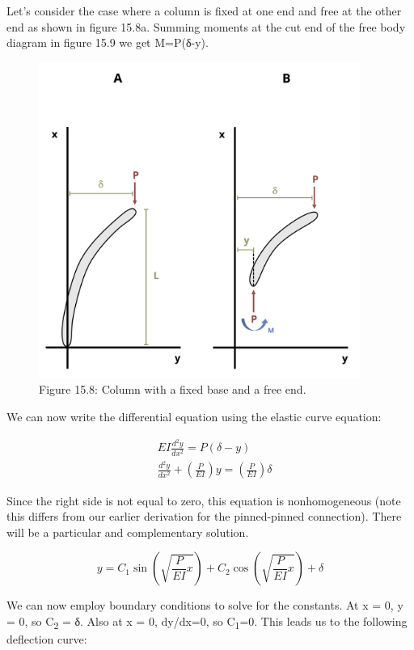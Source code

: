 \documentclass[
  letterpaper,
  DIV=11,
  numbers=noendperiod]{scrreprt}
\begin{document}
Let's consider the case where a column is fixed at one end and free at
the other end as shown in figure 15.8a. Summing moments at the cut end
of the free body diagram in figure 15.9 we get M=P(δ-y).

\begin{figure}[H]

{\centering \includegraphics[width=4.14583in,height=\textheight]{images/CH15s PNGs/figure 15.8.png}

}

\caption{Figure 15.8: Column with a fixed base and a free end.}

\end{figure}%

We can now write the differential equation using the elastic curve
equation:

\[
\begin{aligned}
& E I \frac{d^2 y}{d x^2}=P(\delta-y) \\
& \frac{d^2 y}{d x^2}+\left(\frac{P}{E I}\right) y=\left(\frac{P}{E I}\right) \delta
\end{aligned}
\]

Since the right side is not equal to zero, this equation is
nonhomogeneous (note this differs from our earlier derivation for the
pinned-pinned connection). There will be a particular and complementary
solution.

\[
y=C_1 \sin \left(\sqrt{\frac{P}{E I} x}\right)+C_2 \cos \left(\sqrt{\frac{P}{E I} x}\right)+\delta
\]

We can now employ boundary conditions to solve for the constants. At x =
0, y = 0, so C\textsubscript{2} = δ. Also at x = 0, dy/dx=0, so
C\textsubscript{1}=0. This leads us to the following deflection curve:
\end{document}
